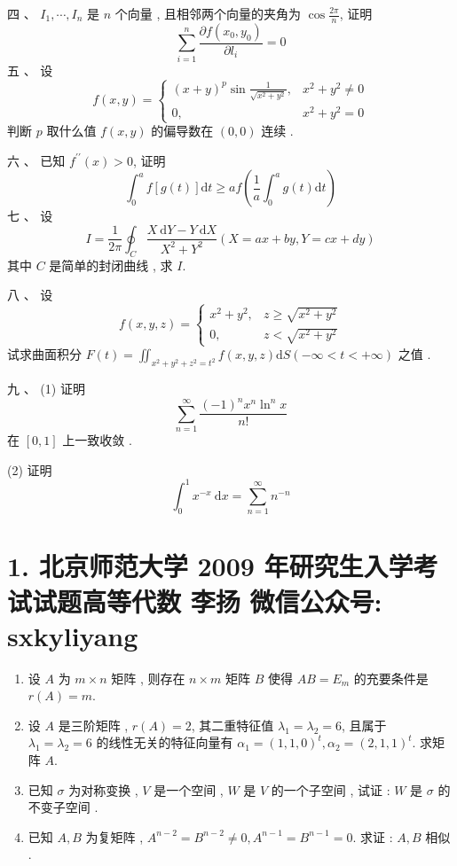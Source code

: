 \documentclass[10pt]{article}
\begin{document}
{ 四 、 $I_{1}, \cdots, I_{n}$  是  $n$  个向量 ,  且相邻两个向量的夹角为  $\cos \frac{2 \pi}{n}$,  证明 
$$
\sum_{i=1}^{n} \frac{\partial f\left(x_{0}, y_{0}\right)}{\partial l_{i}}=0
$$
 五 、 设 
$$
f(x, y)= \begin{cases}(x+y)^{p} \sin \frac{1}{\sqrt{x^{2}+y^{2}}}, & x^{2}+y^{2} \neq 0 \\ 0, & x^{2}+y^{2}=0\end{cases}
$$
 判断  $p$  取什么值  $f(x, y)$  的偏导数在  $(0,0)$  连续 .

 六 、 已知  $f^{\prime \prime}(x)>0$,  证明 
$$
\int_{0}^{a} f[g(t)] \mathrm{d} t \geq a f\left(\frac{1}{a} \int_{0}^{a} g(t) \mathrm{d} t\right)
$$
 七 、 设 
$$
I=\frac{1}{2 \pi} \oint_{C} \frac{X \mathrm{~d} Y-Y \mathrm{~d} X}{X^{2}+Y^{2}}(X=a x+b y, Y=c x+d y)
$$
 其中  $C$  是简单的封闭曲线 ,  求  $I$.

 八 、 设 
$$
f(x, y, z)= \begin{cases}x^{2}+y^{2}, & z \geq \sqrt{x^{2}+y^{2}} \\ 0, & z<\sqrt{x^{2}+y^{2}}\end{cases}
$$
 试求曲面积分  $F(t)=\iint_{x^{2}+y^{2}+z^{2}=t^{2}} f(x, y, z) \mathrm{d} S(-\infty<t<+\infty)$  之值 .

 九 、 (1)  证明 
$$
\sum_{n=1}^{\infty} \frac{(-1)^{n} x^{n} \ln ^{n} x}{n !}
$$
 在  $[0,1]$  上一致收敛 .

(2)  证明 
$$
\int_{0}^{1} x^{-x} \mathrm{~d} x=\sum_{n=1}^{\infty} n^{-n}
$$

\section{1. 北京师范大学 2009 年研究生入学考试试题高等代数 
 李扬 
 微信公众号: sxkyliyang}
\begin{enumerate}
  \item  设  $A$  为  $m \times n$  矩阵 ,  则存在  $n \times m$  矩阵  $B$  使得  $A B=E_{m}$  的充要条件是  $r(A)=m$.

  \item  设  $A$  是三阶矩阵 , $r(A)=2$,  其二重特征值  $\lambda_{1}=\lambda_{2}=6$,  且属于  $\lambda_{1}=\lambda_{2}=6$  的线性无关的特征向量有  $\alpha_{1}=(1,1,0)^{t}, \alpha_{2}=(2,1,1)^{t}$.  求矩阵  $A$.

  \item  已知  $\sigma$  为对称变换 , $V$  是一个空间 , $W$  是  $V$  的一个子空间 ,  试证 : $W$  是  $\sigma$  的不变子空间 .

  \item  已知  $A, B$  为复矩阵 , $A^{n-2}=B^{n-2} \neq 0, A^{n-1}=B^{n-1}=0$.  求证 : $A, B$  相似 .


\end{enumerate}}
\end{document}
